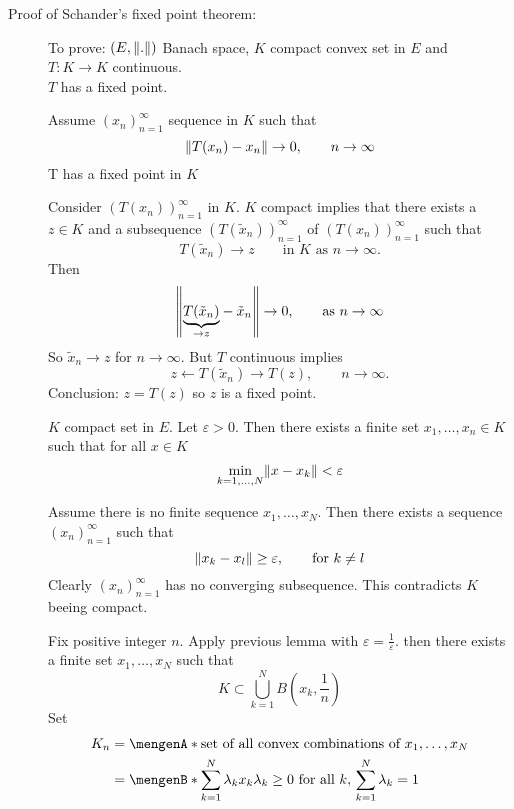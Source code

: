 \begin{description}
	\item[Proof of Schander's fixed point theorem:]
	To prove: $(E, \norm{.})$ Banach space, $K$ compact convex set in $E$ and $T: K \to K$ continuous. \\
	$T$ has a fixed point. \\
	\begin{beweis}
		\begin{lemma}
			Assume $(x_n)_{n=1}^{\infty}$ sequence in $K$ such that
			\[
				\norm{T(x_n)-x_n} \to 0, \qquad  n \to \infty
			\]
			T has a fixed point in $K$
		\end{lemma}
		\begin{beweis}
			Consider $(T(x_n))_{n=1}^{\infty}$ in $K$. $K$ compact implies that there exists a $z \in K$ and a subsequence $(T(\tilde x_n))_{n=1}^{\infty}$ of $(T(x_n))_{n=1}^{\infty}$ such that 
			\[
				T(\tilde x_n) \to  z \qquad  \text{in $K$ as }n \to \infty.
			\]
			Then
			\[
				\norm{\underset{\to z}{\underbrace{T(\tilde x_n)}}- \tilde x_n} \to 0, \qquad \text{as }n \to \infty
			\]
			So $\tilde x_n \to z$ for $n \to \infty$. But $T$ continuous implies 
			\[
				z \leftarrow T( \tilde x_n) \to T(z), \qquad  n \to \infty.
			\]
			Conclusion: $z = T(z)$ so $z$ is a fixed point.
		\end{beweis}
		\begin{lemma}
			$K$ compact set in $E$. Let $\varepsilon >0$. Then there exists a finite set $x_1,\dots,x_n \in K$ such that for all $x \in K$
			\[
				\min\limits_{k = 1, \dots, N} \norm{x- x_k} < \varepsilon
			\] 
		\end{lemma}
		\begin{beweis}
			Assume there is no finite sequence $x_1, \dots, x_N$. Then there exists a sequence $(x_n)_{n=1}^{\infty}$ such that
			\[
				\norm{x_k-x_l} \geq \varepsilon, \qquad \text{for }k \neq l
			\]
			Clearly $(x_n)_{n=1}^{\infty}$ has no converging subsequence. This contradicts $K$ beeing compact.
		\end{beweis}
		Fix positive integer $n$. Apply previous lemma with $\varepsilon = \frac{1}{\varepsilon}$. then there exists a finite set $x_1,\dots,x_N$ such that
		\[
			K \subset \bigcup_{k=1}^N B \left(x_k, \frac{1}{n} \right)
		\]
		Set 
		\begin{align*}
			K_n  &= \set{\text{set of all convex combinations of $x_1, \dots,x_N$}} \\
			&= \set[\sum_{k=1}^{N} \lambda_k x_k]{\lambda_k \geq 0 \text{ for all }k,\, \sum_{k=1}^{N}\lambda_k = 1}

\end{align*}
\end{beweis}
\end{description}
